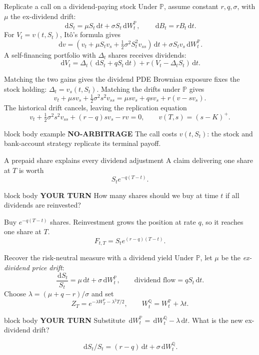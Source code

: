 \documentclass[handout,10pt,aspectratio=169]{beamer}
\newenvironment{marketbox}{\begin{beamercolorbox}[rounded=true,sep=0.7em,wd=\textwidth]{block body example}
  \textbf{\color{CourseGreen}NO-ARBITRAGE}\quad}{\end{beamercolorbox}}
\newenvironment{pausebox}{\begin{beamercolorbox}[rounded=true,sep=0.8em,wd=\textwidth]{block body}
  \textbf{\color{CourseGold}YOUR TURN}\quad}{\end{beamercolorbox}}
\newcommand{\dd}{\,\mathrm d}
\newcommand{\Pp}{\mathbb P}
\newcommand{\Q}{\mathbb Q}
\newcommand{\1}{\mathbf 1}
\begin{document}
\begin{frame}{Replicate a call on a dividend-paying stock}
Under \(\Pp\), assume constant \(r,q,\sigma\), with \(\mu\) the ex-dividend drift:
\[
\dd S_t=\mu S_t\dd t+\sigma S_t\dd W_t^\Pp,
\qquad \dd B_t=rB_t\dd t.
\]
For \(V_t=v(t,S_t)\), It\^o's formula gives
\[
\dd v=(v_t+\mu S_tv_s+\tfrac12\sigma^2S_t^2v_{ss})\dd t
       +\sigma S_tv_s\dd W_t^\Pp.
\]
A self-financing portfolio with \(\Delta_t\) shares receives dividends:
\[
\boxed{\dd V_t=\Delta_t(\dd S_t+qS_t\dd t)
              +r(V_t-\Delta_tS_t)\dd t.}
\]
\end{frame}

\begin{frame}{Matching the two gains gives the dividend PDE}
Brownian exposure fixes the stock holding: \(\Delta_t=v_s(t,S_t)\).
Matching the drifts under \(\Pp\) gives
\[
v_t+\mu s v_s+\tfrac12\sigma^2s^2v_{ss}
=\mu s v_s+qs v_s+r(v-sv_s).
\]
The historical drift cancels, leaving the replication equation
\[
\boxed{v_t+\tfrac12\sigma^2s^2v_{ss}+(r-q)sv_s-rv=0,
\qquad v(T,s)=(s-K)^+.}
\]
\begin{marketbox}
The call costs \(v(t,S_t)\): the stock and bank-account strategy replicate
its terminal payoff.
\end{marketbox}
\end{frame}

\begin{frame}{A prepaid share explains every dividend adjustment}
A claim delivering one share at \(T\) is worth
\[
\boxed{S_te^{-q(T-t)}}.
\]
\begin{pausebox}
How many shares should we buy at time \(t\) if all dividends are reinvested?
\end{pausebox}

Buy \(e^{-q(T-t)}\) shares. Reinvestment grows the position at rate \(q\),
so it reaches one share at \(T\).
\[
F_{t,T}=S_te^{(r-q)(T-t)}.
\]
\end{frame}

\begin{frame}{Recover the risk-neutral measure with a dividend yield}
Under \(\Pp\), let \(\mu\) be the \emph{ex-dividend price drift}:
\[
\frac{\dd S_t}{S_t}=\mu\dd t+\sigma\dd W_t^\Pp,
\qquad \text{dividend flow}=qS_t\dd t.
\]
Choose \(\lambda=(\mu+q-r)/\sigma\) and set
\[
Z_T=e^{-\lambda W_T^\Pp-\lambda^2T/2},
\qquad W_t^\Q=W_t^\Pp+\lambda t.
\]
\begin{pausebox}
Substitute \(\dd W_t^\Pp=\dd W_t^\Q-\lambda\dd t\). What is the new
ex-dividend drift?
\end{pausebox}

\[\boxed{\dd S_t/S_t=(r-q)\dd t+\sigma\dd W_t^\Q.}\]
\end{frame}
\end{document}
